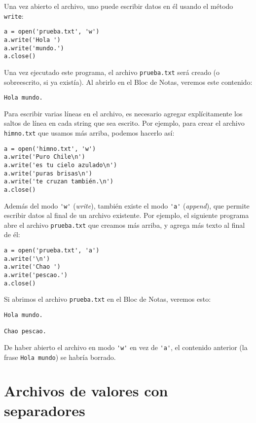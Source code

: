 Una vez abierto el archivo, uno puede escribir datos en él usando el
método \lstinline!write!:

\begin{lstlisting}
a = open('prueba.txt', 'w')
a.write('Hola ')
a.write('mundo.')
a.close()
\end{lstlisting}

Una vez ejecutado este programa, el archivo \lstinline!prueba.txt! será
creado (o sobreescrito, si ya existía). Al abrirlo en el Bloc de Notas,
veremos este contenido:

\begin{lstlisting}
Hola mundo.
\end{lstlisting}

Para escribir varias líneas en el archivo, es necesario agregar
explícitamente los saltos de línea en cada string que sea escrito. Por
ejemplo, para crear el archivo \lstinline!himno.txt! que usamos más
arriba, podemos hacerlo así:

\begin{lstlisting}
a = open('himno.txt', 'w')
a.write('Puro Chile\n')
a.write('es tu cielo azulado\n')
a.write('puras brisas\n')
a.write('te cruzan también.\n')
a.close()
\end{lstlisting}

Además del modo \lstinline!'w'! (\emph{write}), también existe el modo
\lstinline!'a'! (\emph{append}), que permite escribir datos al final de
un archivo existente. Por ejemplo, el siguiente programa abre el archivo
\lstinline!prueba.txt! que creamos más arriba, y agrega más texto al
final de él:

\begin{lstlisting}
a = open('prueba.txt', 'a')
a.write('\n')
a.write('Chao ')
a.write('pescao.')
a.close()
\end{lstlisting}

Si abrimos el archivo \lstinline!prueba.txt! en el Bloc de Notas,
veremos esto:

\begin{lstlisting}
Hola mundo.

Chao pescao.
\end{lstlisting}

De haber abierto el archivo en modo \lstinline!'w'! en vez de
\lstinline!'a'!, el contenido anterior (la frase \lstinline!Hola mundo!)
se habría borrado.

\section{Archivos de valores con separadores}

